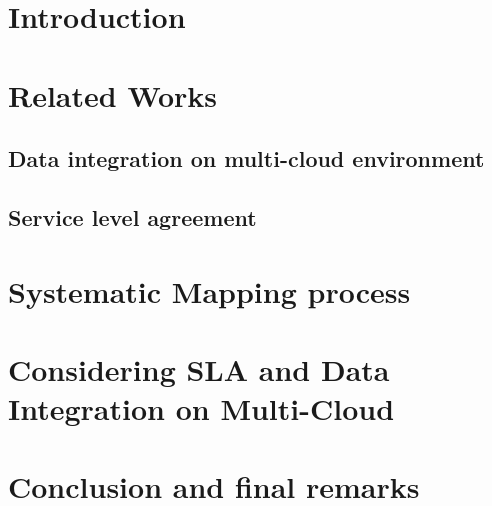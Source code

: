 \documentclass{llncs}
\begin{document}

  



\section{Introduction}
\label{sec:intro}

\section{Related Works}

\subsection{Data integration on multi-cloud environment}

\subsection{Service level agreement}


\section{Systematic Mapping process}


\section{Considering SLA and Data Integration on Multi-Cloud}



\section{Conclusion and final remarks}



 
\end{document}
